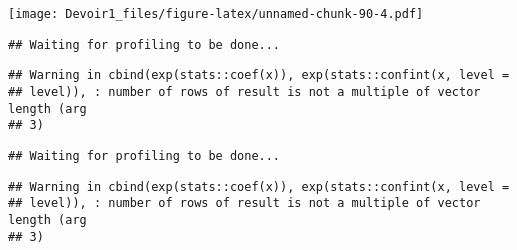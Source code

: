 \documentclass[]{article}
\newenvironment{Shaded}{\begin{snugshade}}{\end{snugshade}}
\newcommand{\KeywordTok}[1]{\textcolor[rgb]{0.13,0.29,0.53}{\textbf{#1}}}
\newcommand{\DataTypeTok}[1]{\textcolor[rgb]{0.13,0.29,0.53}{#1}}
\newcommand{\DecValTok}[1]{\textcolor[rgb]{0.00,0.00,0.81}{#1}}
\newcommand{\StringTok}[1]{\textcolor[rgb]{0.31,0.60,0.02}{#1}}
\newcommand{\OperatorTok}[1]{\textcolor[rgb]{0.81,0.36,0.00}{\textbf{#1}}}
\newcommand{\NormalTok}[1]{#1}
\begin{document}
\texttt{[image: Devoir1\_files/figure-latex/unnamed-chunk-90-4.pdf]}

\begin{Shaded}
\end{Shaded}

\begin{verbatim}
## Waiting for profiling to be done...
\end{verbatim}

\begin{verbatim}
## Warning in cbind(exp(stats::coef(x)), exp(stats::confint(x, level =
## level)), : number of rows of result is not a multiple of vector length (arg
## 3)
\end{verbatim}

\begin{verbatim}
## Waiting for profiling to be done...
\end{verbatim}

\begin{verbatim}
## Warning in cbind(exp(stats::coef(x)), exp(stats::confint(x, level =
## level)), : number of rows of result is not a multiple of vector length (arg
## 3)
\end{verbatim}
\end{document}
